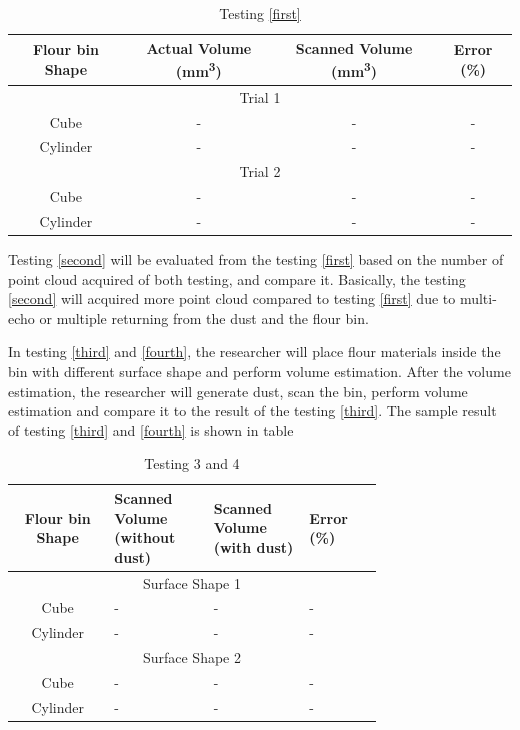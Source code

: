 \begin{table}[H]
    \caption{Testing \ref{first}}
    \label{tab:Testing 1}
    \centering
    \begin{tabular}{|c|c|c|c|}
        \hline
        Flour bin Shape & Actual Volume (\si{mm^3}) & Scanned Volume (\si{mm^3}) & Error (\%) \\
        \hline
        \multicolumn{4}{|c|}{Trial 1} \\
        \hline
        Cube & - & - & - \\
        \hline
        Cylinder & - & - & - \\
        \hline
        \multicolumn{4}{|c|}{Trial 2} \\
        \hline
        Cube & - & - & - \\
        \hline
        Cylinder & - & - & - \\
        \hline
    \end{tabular}
    \end{table}

    Testing \ref{second} will be evaluated from the testing \ref{first} based on the number of point cloud acquired of both testing, and compare it. Basically, the testing \ref{second} will acquired more point cloud compared to testing \ref{first} due to multi-echo or multiple returning from the dust and the flour bin.

In testing \ref{third} and \ref{fourth}, the researcher will place flour materials inside the bin with different surface shape and perform volume estimation. After the volume estimation, the researcher will generate dust, scan the bin, perform volume estimation and compare it to the result of the testing \ref{third}. The sample result of testing \ref{third} and \ref{fourth} is shown in table 

\begin{table}[H]
    \caption{Testing 3 and 4}
    \label{tab:Testing 3 and 4}
    \centering
    \begin{tabular}{|c|p{0.27\linewidth}|p{0.26\linewidth}|p{0.2\linewidth}|}
        \hline
        Flour bin Shape & Scanned Volume (without dust) & Scanned Volume (with dust) & Error (\%) \\
        \hline
        \multicolumn{4}{|c|}{Surface Shape 1} \\
        \hline
        Cube & - & - & - \\
        \hline
        Cylinder & - & - & - \\
        \hline
        \multicolumn{4}{|c|}{Surface Shape 2} \\
        \hline
        Cube & - & - & - \\
        \hline
        Cylinder & - & - & - \\
        \hline
    \end{tabular}
    \end{table}